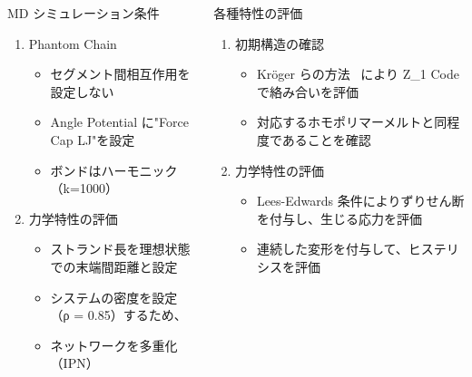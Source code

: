 \begin{columns}[totalwidth=.85\linewidth]
        \begin{itembox}[l]{MD シミュレーション条件}
            \begin{enumerate}
                \item Phantom Chain
                    \begin{itemize}
                        \normalsize
                        \item セグメント間相互作用を設定しない
                        \item Angle Potential に"Force Cap LJ"を設定
                        \item ボンドはハーモニック（k=1000）
                    \end{itemize}
                \item 力学特性の評価
                    \begin{itemize}
                        \normalsize
                        \item ストランド長を理想状態での末端間距離と設定
                        \item システムの密度を設定（ρ = 0.85）するため、
                        \item ネットワークを多重化（IPN）
                    \end{itemize}	
            \end{enumerate}
        \end{itembox}
        
        \begin{itembox}[l]{各種特性の評価}
            \begin{enumerate}
                \item 初期構造の確認
                    \begin{itemize}
                        \normalsize
                        \item Kr\"{o}ger らの方法~\cite{kroger} により Z\_1 Code で絡み合いを評価
                        \item 対応するホモポリマーメルトと同程度であることを確認
                    \end{itemize}
                \item 力学特性の評価
                    \begin{itemize}
                        \normalsize
                        \item Lees-Edwards 条件によりずりせん断を付与し、生じる応力を評価
                        \item 連続した変形を付与して、ヒステリシスを評価
                    \end{itemize}	
            \end{enumerate}
        \end{itembox}
\end{columns}